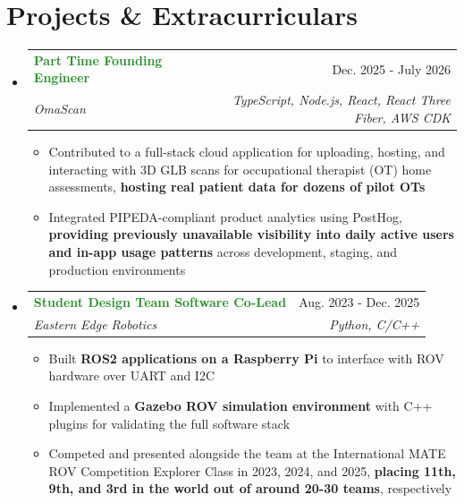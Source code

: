 \documentclass[letterpaper,11pt]{article}
\makeatletter
\newcommand{\resumeItem}[1]{
  \item\small{
    {#1 \vspace{-2pt}}
  }
}
\newcommand{\resumeProjectHeading}[2]{
    \item
    \begin{tabular*}{0.97\textwidth}{l@{\extracolsep{\fill}}r}
      \small#1 & #2 \\
    \end{tabular*}\vspace{-7pt}
}
\newcommand{\resumeProjectSubheading}[4]{
    \item
    \begin{tabular*}{0.97\textwidth}[t]{l@{\extracolsep{\fill}}r}
      \small\textbf{\textcolor{ForestGreen}{#1}} & \small #2 \\
      \textit{\footnotesize #3} & \textit{\footnotesize #4} \\
    \end{tabular*}\vspace{-7pt}
}
\newcommand{\resumeSubHeadingListStart}{\begin{itemize}[leftmargin=0.15in, label={}]}
\newcommand{\resumeSubHeadingListEnd}{\end{itemize}}
\newcommand{\resumeItemListStart}{\begin{itemize}[leftmargin=0.15in]}
\newcommand{\resumeItemListEnd}{\end{itemize}\vspace{-5pt}}
\makeatother
\begin{document}
\section{Projects \& Extracurriculars}
    \resumeSubHeadingListStart
      \resumeProjectSubheading
          {Part Time Founding Engineer}{Dec. 2025 - July 2026}
          {OmaScan}{TypeScript, Node.js, React, React Three Fiber, AWS CDK}
          \resumeItemListStart
            \resumeItem{Contributed to a full-stack cloud application for uploading, hosting, and interacting with 3D GLB scans 
                        for occupational therapist (OT) home assessments, \textbf{hosting real patient data for dozens of pilot OTs}}
            \resumeItem{Integrated PIPEDA-compliant product analytics using PostHog, \textbf{providing previously unavailable visibility
                        into daily active users and in-app usage patterns} across development, staging, and production environments}  
          \resumeItemListEnd
      \resumeProjectSubheading
          {Student Design Team Software Co-Lead}{Aug. 2023 - Dec. 2025}
          {Eastern Edge Robotics}{Python, C/C++}
          \resumeItemListStart
            \resumeItem{Built \textbf{ROS2 applications on a Raspberry Pi} to interface with ROV hardware over UART and I2C}
            \resumeItem{Implemented a \textbf{Gazebo ROV simulation environment} with C++ plugins for validating the full software stack}
            \resumeItem{Competed and presented alongside the team at the International MATE ROV Competition Explorer Class 
                        in 2023, 2024, and 2025, \textbf{placing 11th, 9th, and 3rd in the world out of around 20-30 teams}, respectively}
          \resumeItemListEnd
    \resumeSubHeadingListEnd
\end{document}
